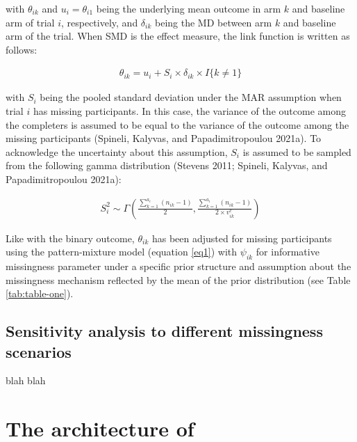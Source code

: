 with \(\theta_{ik}\) and \(u_{i} = \theta_{i1}\) being the underlying mean outcome in
arm \(k\) and baseline arm of trial \(i\), respectively, and \(\delta_{ik}\) being the
MD between arm \(k\) and baseline arm of the trial. When SMD is the effect measure,
the link function is written as follows:

\[\begin{aligned}
\theta_{ik} = u_{i} + S_{i} \times \delta_{ik} \times I\{k \ne 1\}      
\end{aligned}\]

with \(S_{i}\) being the pooled standard deviation under the MAR assumption when
trial \(i\) has missing participants. In this case, the variance of the outcome among
the completers is assumed to be equal to the variance of the outcome among the
missing participants (Spineli, Kalyvas, and Papadimitropoulou 2021a). To acknowledge the uncertainty about this
assumption, \(S_{i}\) is assumed to be sampled from the following gamma distribution
(Stevens 2011; Spineli, Kalyvas, and Papadimitropoulou 2021a):

\[\begin{aligned}
S^{2}_{i} \sim \Gamma\left(\frac{\sum_{k=1}^{a_{i}}(n_{ik} - 1)}{2}, \frac{\sum_{k=1}^{a_{i}}(n_{ik} - 1)}{2 \times v^{c}_{ik}}\right)  
\end{aligned}\]

Like with the binary outcome, \(\theta_{ik}\) has been adjusted for missing participants
using the pattern-mixture model (equation \ref{eq1}) with \(\psi_{ik}\) for informative
missingness parameter under a specific prior structure and assumption about the
missingness mechanism reflected by the mean of the prior distribution (see Table
\ref{tab:table-one}).

\hypertarget{sensitivity-analysis-to-different-missingness-scenarios}{%
\subsection{Sensitivity analysis to different missingness scenarios}\label{sensitivity-analysis-to-different-missingness-scenarios}}

blah blah

\hypertarget{the-architecture-of}{%
\section{\texorpdfstring{The architecture of }{The architecture of }}\label{the-architecture-of}}


